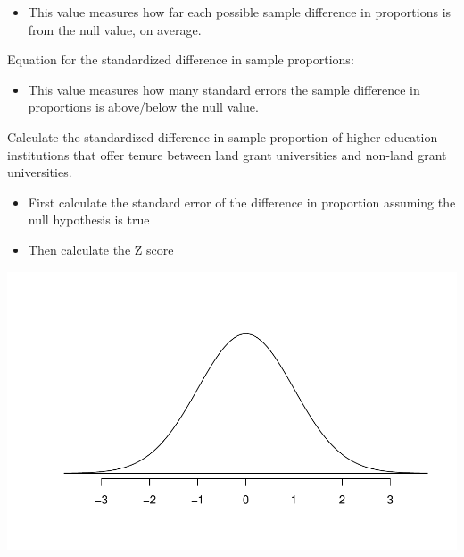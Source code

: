 \documentclass[
]{report}
\providecommand{\tightlist}{%
  \setlength{\itemsep}{0pt}\setlength{\parskip}{0pt}}
\begin{document}
\vspace{0.8in}


\begin{itemize}
\tightlist
\item
  This value measures how far each possible sample difference in proportions is from the null value, on average.
\end{itemize}


Equation for the standardized difference in sample proportions:

\vspace{0.8in}


\begin{itemize}
\tightlist
\item
  This value measures how many standard errors the sample difference in proportions is above/below the null value.
\end{itemize}


Calculate the standardized difference in sample proportion of higher education institutions that offer tenure between land grant universities and non-land grant universities.

\begin{itemize}
\tightlist
\item
  First calculate the standard error of the difference in proportion assuming the null hypothesis is true
\end{itemize}

\vspace{0.4in}

\begin{itemize}
\tightlist
\item
  Then calculate the Z score
\end{itemize}

\vspace{0.4in}

\begin{center}\includegraphics[width=0.5\linewidth]{09-VN09-two-cat-theory_files/figure-latex/standNormc-1} \end{center}
\end{document}
